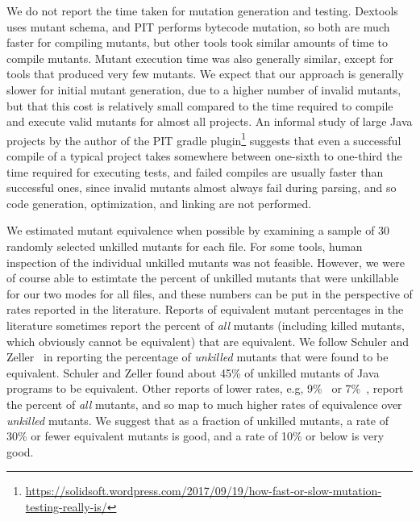 \documentclass[acmsmall,screen,review,anonymous]{acmart}
\begin{document}
{We do not report the time taken for mutation generation and testing.
Dextools uses mutant schema, and PIT performs bytecode mutation, so
both are much faster for compiling mutants, but other tools took similar
amounts of time to compile mutants.   Mutant execution time was also
generally similar, except for tools that produced very few mutants.
We expect that our approach is generally slower for initial mutant
generation, due to a higher number of invalid mutants, but that this
cost is relatively small compared to the time required to compile and
execute valid mutants for almost all projects.  An informal study of
large Java projects by the author of the PIT gradle
plugin\footnote{\url{https://solidsoft.wordpress.com/2017/09/19/how-fast-or-slow-mutation-testing-really-is/}}
  suggests that even a successful compile of a typical project takes
  somewhere between one-sixth to one-third the time required for
  executing tests, and failed compiles are usually faster than
  successful ones, since invalid mutants almost always fail during
  parsing, and so code generation, optimization, and linking are not performed.

We estimated mutant equivalence when possible by examining a sample of
30 randomly selected unkilled mutants for each file.  For some tools,
human inspection of the individual unkilled mutants was not feasible.
However, we were of course able to estimtate the percent of unkilled
mutants that were unkillable for our two modes for all files, and
these numbers can be put in the perspective of rates reported in the
literature.  Reports of equivalent mutant percentages in the
literature sometimes report the percent of \emph{all} mutants
(including killed mutants, which obviously cannot be equivalent) that
are equivalent.  We follow Schuler and Zeller~\cite{EquivMut} in
reporting the percentage of \emph{unkilled} mutants that were found to
be equivalent.  Schuler and Zeller found about 45\% of unkilled
mutants of Java programs to be equivalent.  Other reports of lower
rates, e.g, 9\%~\cite{offutt1997automatically} or 7\%~\cite{TCE}, report the percent of
\emph{all} mutants, and so map to much higher rates of
equivalence over \emph{unkilled} mutants.  We suggest that as a
fraction of unkilled mutants, a rate of 30\% or fewer equivalent
mutants is good, and a rate of 10\% or below is very good.

}
\end{document}
